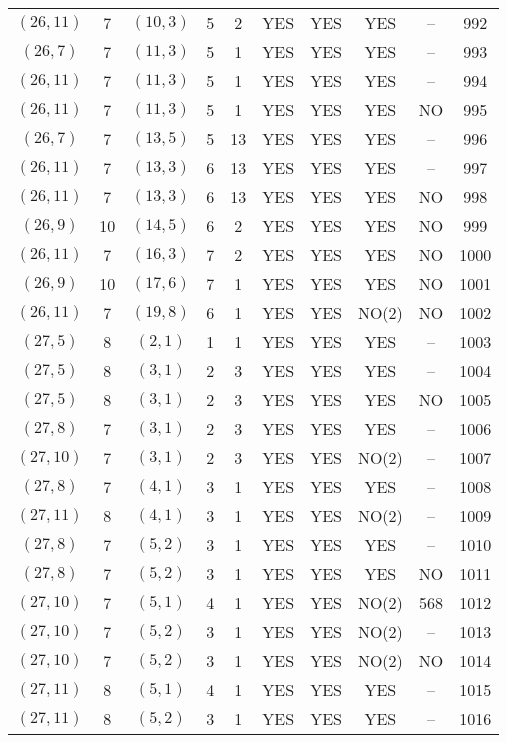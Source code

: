 \begin{longtable}{|c|c|c|c|c|c|c|c|c|c|}
$(26, 11)$ & 7 & $(10, 3)$ & 5 & 2 & YES & YES & YES & -- & 992\\
$(26, 7)$ & 7 & $(11, 3)$ & 5 & 1 & YES & YES & YES & -- & 993\\
$(26, 11)$ & 7 & $(11, 3)$ & 5 & 1 & YES & YES & YES & -- & 994\\
$(26, 11)$ & 7 & $(11, 3)$ & 5 & 1 & YES & YES & YES & NO & 995\\
$(26, 7)$ & 7 & $(13, 5)$ & 5 & 13 & YES & YES & YES & -- & 996\\
$(26, 11)$ & 7 & $(13, 3)$ & 6 & 13 & YES & YES & YES & -- & 997\\
$(26, 11)$ & 7 & $(13, 3)$ & 6 & 13 & YES & YES & YES & NO & 998\\
$(26, 9)$ & 10 & $(14, 5)$ & 6 & 2 & YES & YES & YES & NO & 999\\
$(26, 11)$ & 7 & $(16, 3)$ & 7 & 2 & YES & YES & YES & NO & 1000\\
$(26, 9)$ & 10 & $(17, 6)$ & 7 & 1 & YES & YES & YES & NO & 1001\\
$(26, 11)$ & 7 & $(19, 8)$ & 6 & 1 & YES & YES & NO(2) & NO & 1002\\
$(27, 5)$ & 8 & $(2, 1)$ & 1 & 1 & YES & YES & YES & -- & 1003\\
$(27, 5)$ & 8 & $(3, 1)$ & 2 & 3 & YES & YES & YES & -- & 1004\\
$(27, 5)$ & 8 & $(3, 1)$ & 2 & 3 & YES & YES & YES & NO & 1005\\
$(27, 8)$ & 7 & $(3, 1)$ & 2 & 3 & YES & YES & YES & -- & 1006\\
$(27, 10)$ & 7 & $(3, 1)$ & 2 & 3 & YES & YES & NO(2) & -- & 1007\\
$(27, 8)$ & 7 & $(4, 1)$ & 3 & 1 & YES & YES & YES & -- & 1008\\
$(27, 11)$ & 8 & $(4, 1)$ & 3 & 1 & YES & YES & NO(2) & -- & 1009\\
$(27, 8)$ & 7 & $(5, 2)$ & 3 & 1 & YES & YES & YES & -- & 1010\\
$(27, 8)$ & 7 & $(5, 2)$ & 3 & 1 & YES & YES & YES & NO & 1011\\
$(27, 10)$ & 7 & $(5, 1)$ & 4 & 1 & YES & YES & NO(2) & 568 & 1012\\
$(27, 10)$ & 7 & $(5, 2)$ & 3 & 1 & YES & YES & NO(2) & -- & 1013\\
$(27, 10)$ & 7 & $(5, 2)$ & 3 & 1 & YES & YES & NO(2) & NO & 1014\\
$(27, 11)$ & 8 & $(5, 1)$ & 4 & 1 & YES & YES & YES & -- & 1015\\
$(27, 11)$ & 8 & $(5, 2)$ & 3 & 1 & YES & YES & YES & -- & 1016\\

\end{longtable}
